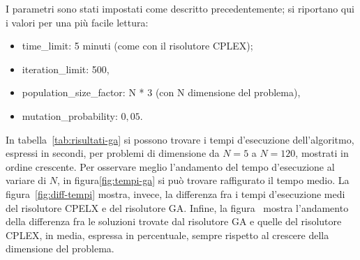 I parametri sono stati impostati come descritto precedentemente; si riportano qui i valori per una più facile lettura:
\begin{itemize}
	\item \textsf{time\_limit}: 5 minuti (come con il risolutore CPLEX);
	\item \textsf{iteration\_limit}: 500,
	\item \textsf{population\_size\_factor}: N * 3 (con N dimensione del problema),
	\item \textsf{mutation\_probability}: $0,05$.
\end{itemize}
In tabella~\ref{tab:risultati-ga} si possono trovare i tempi d'esecuzione dell'algoritmo, espressi in secondi, per
problemi di dimensione da $N=5$ a $N=120$, mostrati in ordine crescente.
Per osservare meglio l'andamento del tempo d'esecuzione al variare di $N$, in figura\ref{fig:tempi-ga}
si può trovare raffigurato il tempo medio.
La figura~\ref{fig:diff-tempi} mostra, invece, la differenza fra i tempi d'esecuzione medi del risolutore
CPELX e del risolutore GA.
Infine, la figura~\label{fig:gap-sol} mostra l'andamento della differenza fra le soluzioni trovate
dal risolutore GA e quelle del risolutore CPLEX, in media, espressa in percentuale, sempre rispetto
al crescere della dimensione del problema.
%
